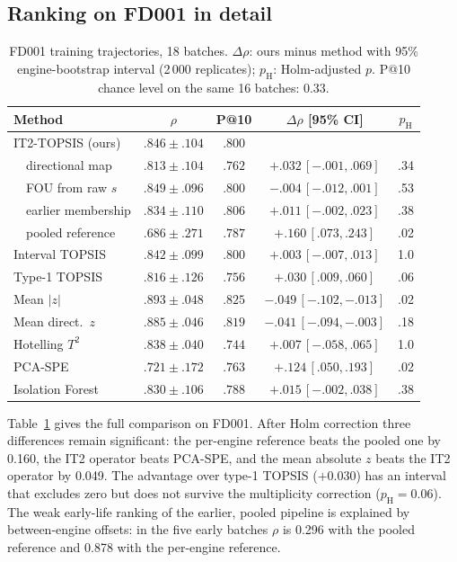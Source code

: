 \documentclass[journal,10pt,twocolumn]{IEEEtran}
\begin{document}
\subsection{Ranking on FD001 in detail}
\begin{table}[t]
\centering
\footnotesize
\caption{FD001 training trajectories, 18 batches. $\Delta\rho$: ours minus method with 95\% engine-bootstrap interval (2\,000 replicates); $p_{\mathrm H}$: Holm-adjusted $p$. P@10 chance level on the same 16 batches: 0.33.}
\label{tab:rank}
\setlength{\tabcolsep}{1.6pt}
\begin{tabular}{lcccc}
\toprule
Method & $\rho$ & P@10 & $\Delta\rho$ [95\% CI] & $p_{\mathrm H}$ \\
\midrule
IT2-TOPSIS (ours) & $.846\pm.104$ & $.800$ & & \\
\ \ directional map & $.813\pm.104$ & $.762$ & $+.032\,[-.001,.069]$ & .34 \\
\ \ FOU from raw $s$ & $.849\pm.096$ & $.800$ & $-.004\,[-.012,.001]$ & .53 \\
\ \ earlier membership & $.834\pm.110$ & $.806$ & $+.011\,[-.002,.023]$ & .38 \\
\ \ pooled reference & $.686\pm.271$ & $.787$ & $+.160\,[.073,.243]$ & .02 \\
Interval TOPSIS & $.842\pm.099$ & $.800$ & $+.003\,[-.007,.013]$ & 1.0 \\
Type-1 TOPSIS & $.816\pm.126$ & $.756$ & $+.030\,[.009,.060]$ & .06 \\
Mean $|z|$ & $.893\pm.048$ & $.825$ & $-.049\,[-.102,-.013]$ & .02 \\
Mean direct.\ $z$ & $.885\pm.046$ & $.819$ & $-.041\,[-.094,-.003]$ & .18 \\
Hotelling $T^2$ & $.838\pm.040$ & $.744$ & $+.007\,[-.058,.065]$ & 1.0 \\
PCA-SPE & $.721\pm.172$ & $.763$ & $+.124\,[.050,.193]$ & .02 \\
Isolation Forest & $.830\pm.106$ & $.788$ & $+.015\,[-.002,.038]$ & .38 \\
\bottomrule
\end{tabular}
\end{table}
Table~\ref{tab:rank} gives the full comparison on FD001. After Holm correction three differences remain significant: the per-engine reference beats the pooled one by 0.160, the IT2 operator beats PCA-SPE, and the mean absolute $z$ beats the IT2 operator by 0.049. The advantage over type-1 TOPSIS ($+0.030$) has an interval that excludes zero but does not survive the multiplicity correction ($p_{\mathrm H}=0.06$). The weak early-life ranking of the earlier, pooled pipeline is explained by between-engine offsets: in the five early batches $\rho$ is 0.296 with the pooled reference and 0.878 with the per-engine reference.
\end{document}

